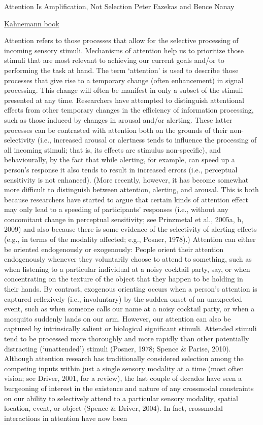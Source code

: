 Attention Is Amplification, Not Selection Peter Fazekas and Bence Nanay 

\href{https://scholar.princeton.edu/sites/default/files/kahneman/files/attention_hi_quality.pdf}{Kahnemann book}

Attention refers to those processes that allow for the selective processing of incoming sensory stimuli. Mechanisms of attention help us to prioritize those stimuli that are most relevant to achieving our current goals and/or to performing the task at hand. The term ‘attention’ is used to describe those processes that give rise to a temporary change (often enhancement) in signal processing. This change will often be manifest in only a subset of the stimuli presented at any time. Researchers have attempted to distinguish attentional effects from other temporary changes in the efficiency of information processing, such as those induced by changes in arousal and/or alerting. These latter processes can be contrasted with attention both on the grounds of their non-selectivity (i.e., increased arousal or alertness tends to influence the processing of all incoming stimuli; that is, its effects are stimulus non-specific), and behaviourally, by the fact that while alerting, for example, can speed up a person’s response it also tends to result in increased errors (i.e., perceptual sensitivity is not enhanced). (More recently, however, it has become somewhat more difficult to distinguish between attention, alerting, and arousal. This is both because researchers have started to argue that certain kinds of attention effect may only lead to a speeding of participants’ responses (i.e., without any concomitant change in perceptual sensitivity; see Prinzmetal et al., 2005a, b, 2009) and also because there is some evidence of the selectivity of alerting effects (e.g., in terms of the modality affected; e.g., Posner, 1978).) Attention can either be oriented endogenously or exogenously: People orient their attention endogenously whenever they voluntarily choose to attend to something, such as when listening to a particular individual at a noisy cocktail party, say, or when concentrating on the texture of the object that they happen to be holding in their hands. By contrast, exogenous orienting occurs when a person’s attention is captured reflexively (i.e., involuntary) by the sudden onset of an unexpected event, such as when someone calls our name at a noisy cocktail party, or when a mosquito suddenly lands on our arm. However, our attention can also be captured by intrinsically salient or biological significant stimuli. Attended stimuli tend to be processed more thoroughly and more rapidly than other potentially distracting (‘unattended’) stimuli (Posner, 1978; Spence \& Parise, 2010). Although attention research has traditionally considered selection among the competing inputs within just a single sensory modality at a time (most often vision; see Driver, 2001, for a review), the last couple of decades have seen a burgeoning of interest in the existence and nature of any crossmodal constraints on our ability to selectively attend to a particular sensory modality, spatial location, event, or object (Spence \& Driver, 2004). In fact, crossmodal interactions in attention have now been 
